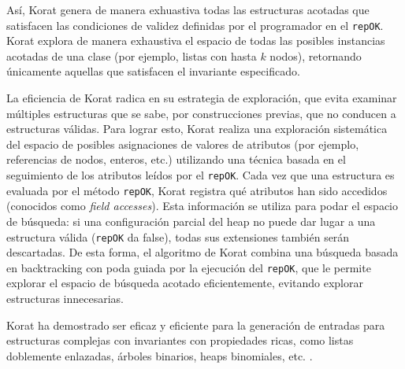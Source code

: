 Así, Korat genera de manera exhuastiva todas las estructuras acotadas que
satisfacen las condiciones de validez definidas por el programador en el
\texttt{repOK}. 
Korat explora de manera exhaustiva el espacio de todas las posibles instancias
acotadas de una clase (por ejemplo, listas con hasta $k$ nodos), 
retornando únicamente aquellas que satisfacen el invariante especificado. 

La eficiencia de Korat radica en su estrategia de exploración, 
que evita examinar múltiples estructuras que se sabe, por construcciones previas, que no conducen a estructuras válidas. 
Para lograr esto, Korat realiza una exploración sistemática del espacio de
posibles asignaciones de valores de atributos (por ejemplo, referencias de
nodos, enteros, etc.) utilizando una técnica basada en el seguimiento de los
atributos  leídos por el \texttt{repOK}.
Cada vez que una estructura es evaluada por el método \texttt{repOK}, Korat
registra qué atributos han sido accedidos (conocidos como \emph{field
accesses}). Esta información se utiliza para podar el espacio de búsqueda: si
una configuración parcial del heap no puede dar lugar a una estructura válida
(\texttt{repOK} da false), todas sus extensiones también serán descartadas.
De esta forma, el algoritmo de Korat combina una búsqueda basada en backtracking con poda
guiada por la ejecución del \texttt{repOK}, que le permite explorar 
el espacio de búsqueda acotado eficientemente, evitando explorar estructuras innecesarias. 

Korat ha demostrado ser eficaz y eficiente para la generación de entradas para
estructuras complejas con invariantes con propiedades ricas, como
listas doblemente enlazadas, árboles binarios, heaps binomiales, etc. \cite{Boyapati02}.









